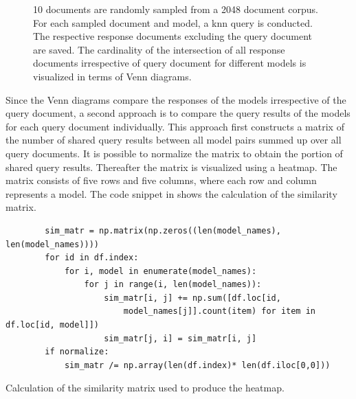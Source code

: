 \begin{figure}%
    \centering
    \qquad
    \qquad
    \qquad   
    \caption[Venn diagram of query results]{
    10 documents are randomly sampled from a 2048 document corpus.
    For each sampled document and model, a \ac{knn} query is conducted.
    The respective response documents excluding the query document are saved.
    The cardinality of the intersection of all response documents irrespective of query document for different models is visualized in terms of Venn diagrams.}%
    \label{fig:venn-comparison-models}%
\end{figure}

Since the Venn diagrams compare the responses of the models irrespective of the query document, 
a second approach is to compare the query results of the models for each query document individually.
This approach first constructs a matrix of the number of shared query results between all model pairs summed up over all query documents.
It is possible to normalize the matrix to obtain the portion of shared query results.
Thereafter the matrix is visualized using a heatmap.
The matrix consists of five rows and five columns, where each row and column represents a model.
The code snippet in  shows the calculation of the similarity matrix.

\begin{listing}[htp]
    \begin{verbatim}
        sim_matr = np.matrix(np.zeros((len(model_names), len(model_names))))
        for id in df.index:
            for i, model in enumerate(model_names):
                for j in range(i, len(model_names)):
                    sim_matr[i, j] += np.sum([df.loc[id, 
                        model_names[j]].count(item) for item in df.loc[id, model]])
                    sim_matr[j, i] = sim_matr[i, j]
        if normalize:
            sim_matr /= np.array(len(df.index)* len(df.iloc[0,0]))
    \end{verbatim}
    \caption{Calculation of the similarity matrix used to produce the heatmap.
    }
    \label{lst:sim-matrix}
\end{listing}

